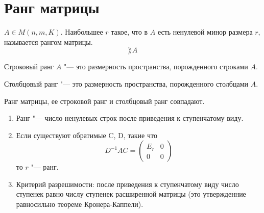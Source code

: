 ﻿\section{Ранг матрицы}
\begin{Def}
	$A \in M(n, m, K)$.
	Наибольшее $r$ такое, что в $A$ есть ненулевой минор размера $r$, называется рангом матрицы.
	\[ \rang A \]
\end{Def}

\begin{Def}
	Строковый ранг $A$ "--- это размерность пространства, порожденного строками $A$.
\end{Def}

\begin{Def}
	Столбцовый ранг "--- это размерность пространства, порожденного столбцами $A$.
\end{Def}

\begin{theorem}
	Ранг матрицы, ее строковой ранг и столбцовый ранг совпадают.
\end{theorem}

\begin{Rem}
	
	\begin{enumerate}
	\item
		Ранг "--- число ненулевых строк после приведения к ступенчатому виду.
	\item
		Если существуют обратимые C, D, такие что
		\[
			D^{-1}AC = \begin{pmatrix}
				E_r & 0 \\
				0   & 0
			\end{pmatrix}
		\]
		то $r$ "--- ранг.

	\item
		Критерий разрешимости: после приведения к ступенчатому виду число ступенек равно числу ступенек расширенной матрицы
		(это утвержденние равносильно теореме Кронера-Каппели).
	\end{enumerate}
\end{Rem}

